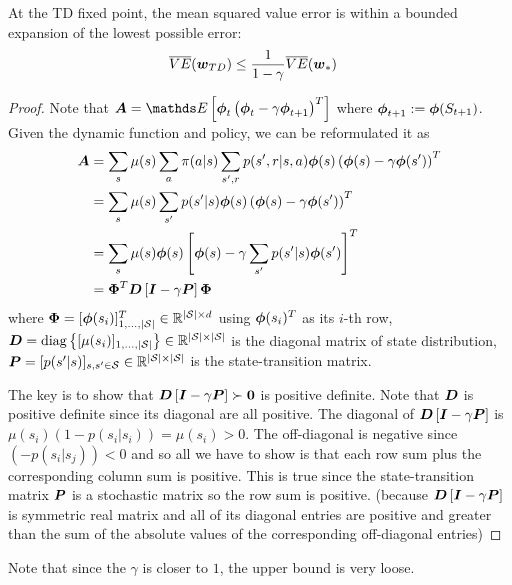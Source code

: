 \documentclass[11pt]{article}
\begin{document}
\begin{theorem}
At the TD fixed point, the mean squared value error is within a bounded expansion of the lowest possible error:
\begin{align*}
\overline{VE}(\boldsymbol{w}_{TD}) &\le \frac{1}{1-\gamma} \overline{VE}(\boldsymbol{w}_{*})
\end{align*}
\end{theorem}
\begin{proof}
Note that $\mb{A} = \E{}{\mb{\phi}_{t}\paren{\mb{\phi}_{t} - \gamma \mb{\phi}_{t+1} }^{T}}$ where $ \boldsymbol{\phi}_{t+1} :=  \boldsymbol{\phi}(S_{t+1})$. Given the dynamic function and policy, we can be reformulated it as 
\begin{align*}
\boldsymbol{A} &= \sum_{s}\mu(s)\sum_{a}\pi(a|s) \sum_{s', r}p(s', r| s, a)\boldsymbol{\phi}(s)\left(\boldsymbol{\phi}(s) - \gamma \boldsymbol{\phi}(s')\right)^{T}\\
&=  \sum_{s}\mu(s)\sum_{s'}p(s'|s)\boldsymbol{\phi}(s)\left(\boldsymbol{\phi}(s) - \gamma \boldsymbol{\phi}(s')\right)^{T}\\
&= \sum_{s}\mu(s)\boldsymbol{\phi}(s)\left[\boldsymbol{\phi}(s) - \gamma  \sum_{s'}p(s'|s)\boldsymbol{\phi}(s')\right]^{T} \\
&= \boldsymbol{\Phi}^{T}\boldsymbol{D}\left[\boldsymbol{I} - \gamma \boldsymbol{P}\right]\boldsymbol{\Phi}
\end{align*} where $ \boldsymbol{\Phi} = [\boldsymbol{\phi}(s_{i})]_{1,\ldots,|{\mathcal S}|}^{T} \in {\mathbb R}^{|{\mathcal S}| \times d}$ using $\boldsymbol{\phi}(s_{i})^{T}$ as its $i$-th row, $\boldsymbol{D} = \text{diag}\left\{[\mu(s_{i})]_{1,\ldots,|{\mathcal S}|}\right\}  \in {\mathbb R}^{|{\mathcal S}| \times |{\mathcal S}|}$ is the diagonal matrix of state distribution, $\boldsymbol{P} = [p(s'|s)]_{s,s' \in {\mathcal S}} \in  {\mathbb R}^{|{\mathcal S}| \times |{\mathcal S}|}$ is the state-transition matrix. 

The key is to show that $\boldsymbol{D}\left[\boldsymbol{I} - \gamma \boldsymbol{P}\right] \succ \boldsymbol{0}$ is positive definite. Note that $\boldsymbol{D}$ is positive definite since its diagonal are all positive. The diagonal of  $\boldsymbol{D}\left[\boldsymbol{I} - \gamma \boldsymbol{P}\right]$ is $\mu(s_{i})(1-p(s_{i}|s_{i})) = \mu(s_{i}) >0$. The off-diagonal is negative since $(-p(s_{i}|s_{j})) < 0$ and so all we have to show is that each row sum plus the corresponding column sum is positive. This is true since the state-transition matrix $\boldsymbol{P}$ is a stochastic matrix so the row sum is positive. (because $\boldsymbol{D}\left[\boldsymbol{I} - \gamma \boldsymbol{P}\right]$ is symmetric real matrix and all of its diagonal entries are positive and greater than the sum of the absolute values of the corresponding off-diagonal entries) \QEDA
\end{proof}
Note that since the $\gamma$ is closer to $1$, the upper bound is very loose. 
\end{document}
